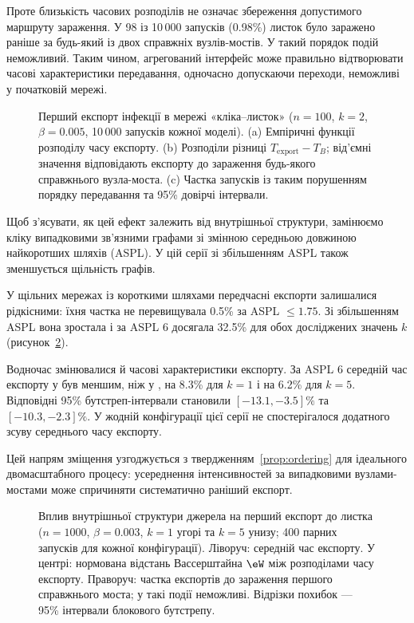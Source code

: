 Проте близькість часових розподілів
не означає збереження допустимого
маршруту зараження.
У 98 із 10\,000 запусків \TS{} (0.98\%)
листок було заражено раніше за будь-який
із двох справжніх вузлів-мостів.
У \Full{} такий порядок подій неможливий.
Таким чином, агрегований інтерфейс може
правильно відтворювати часові характеристики
передавання, одночасно допускаючи
переходи, неможливі у початковій мережі.

\begin{figure}[tbp]
\centering
\caption{%
Перший експорт інфекції в мережі
«кліка--листок» ($n=100$, $k=2$,
$\beta=0.005$, 10\,000 запусків кожної моделі).
(a) Емпіричні функції розподілу часу експорту.
(b) Розподіли різниці $T_{\mathrm{export}}-T_B$;
від'ємні значення відповідають експорту
до зараження будь-якого справжнього вузла-моста.
(c) Частка запусків із таким порушенням
порядку передавання та 95\% довірчі інтервали.
}
\label{fig:clique_leaf}
\end{figure}

Щоб з'ясувати, як цей ефект залежить
від внутрішньої структури, замінюємо
кліку випадковими зв'язними графами
зі змінною середньою довжиною
найкоротших шляхів (ASPL).
У цій серії зі збільшенням ASPL
також зменшується щільність графів.

У щільних мережах із короткими шляхами
передчасні експорти залишалися рідкісними:
їхня частка не перевищувала 0.5\%
за ASPL $\leq 1.75$.
Зі збільшенням ASPL вона зростала
і за ASPL 6 досягала 32.5\%
для обох досліджених значень $k$
(рисунок~\ref{fig:source_sweep}).

Водночас змінювалися й часові характеристики
експорту. За ASPL 6 середній час експорту
у \TS{} був меншим, ніж у \Full{},
на 8.3\% для $k=1$ і на 6.2\% для $k=5$.
Відповідні 95\% бутстреп-інтервали
становили $[-13.1,-3.5]\%$
та $[-10.3,-2.3]\%$.
У жодній конфігурації цієї серії
не спостерігалося додатного
зсуву середнього часу експорту.

Цей напрям зміщення узгоджується
з твердженням~\ref{prop:ordering}
для ідеального двомасштабного процесу:
усереднення інтенсивностей за випадковими
вузлами-мостами може спричиняти
систематично раніший експорт.

\begin{figure}[tbp]
\centering
\caption{%
Вплив внутрішньої структури джерела
на перший експорт до листка
($n=1000$, $\beta=0.003$, $k=1$ угорі
та $k=5$ унизу; 400 парних запусків
для кожної конфігурації).
Ліворуч: середній час експорту.
У центрі: нормована відстань Вассерштайна
$\eW$ між розподілами часу експорту.
Праворуч: частка експортів \TS{}
до зараження першого справжнього моста;
у \Full{} такі події неможливі.
Відрізки похибок --- 95\% інтервали
блокового бутстрепу.
}
\label{fig:source_sweep}
\end{figure}

